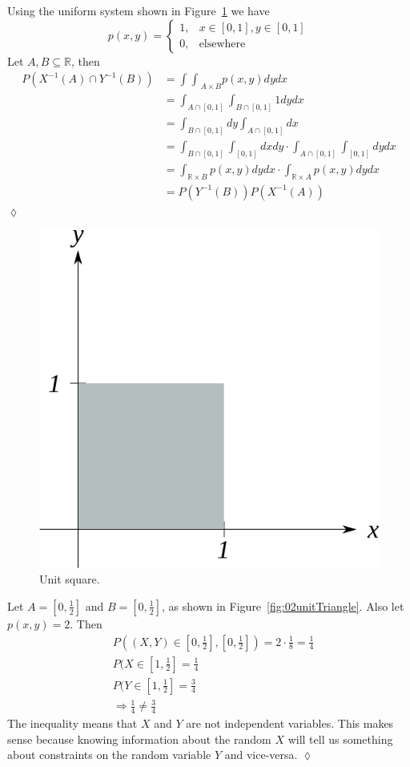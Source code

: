 \begin{example}
Using the uniform system shown in Figure~\ref{fig:02unitSquare} we have
$$p(x,y) = \begin{cases} 1, & x\in[0,1],y\in[0,1] \\ 0, & \text{elsewhere} \end{cases}$$
Let $A,B\subseteq\mathbb{R}$, then
\begin{align*}
P(X^{-1}(A) \cap Y^{-1}(B)) &= {\int\int}_{A\times B} p(x,y)dydx \\
&= \int_{A\cap[0,1]}\int_{B\cap[0,1]} 1 dydx \\
&= \int_{B\cap[0,1]}dy \int_{A\cap[0,1]}dx \\
&= \int_{B\cap[0,1]}\int_{[0,1]}dxdy \cdot \int_{A\cap[0,1]}\int_{[0,1]}dydx \\
&= \int_{\mathbb{R}\times B}p(x,y)dydx \cdot \int_{\mathbb{R}\times A}p(x,y)dydx \\
&= P(Y^{-1}(B)) P(X^{-1}(A))
\end{align*}
$\lozenge$
\end{example}

\begin{figure}[ht!]
\centering
\includegraphics[width=.3\textwidth]{images/02unitSquare}
\caption{Unit square.}
\label{fig:02unitSquare}
\end{figure}

\begin{example}
Let $A=[0,\frac{1}{2}]$ and $B=[0,\frac{1}{2}]$, as shown in Figure~\ref{fig:02unitTriangle}.
Also let $p(x,y)=2$.
Then
\begin{align*}
&P((X,Y)\in [0,\frac{1}{2}],[0,\frac{1}{2}]) = 2\cdot \frac{1}{8} = \frac{1}{4} \\
&P(X\in[1,\frac{1}{2}] = \frac{1}{4} \\
&P(Y\in[1,\frac{1}{2}] = \frac{3}{4} \\
&\Rightarrow \frac{1}{4} \neq \frac{3}{4}
\end{align*}
The inequality means that $X$ and $Y$ are not independent variables.
This makes sense because knowing information about the random $X$ will tell us something about constraints on the random variable $Y$ and vice-versa.
$\lozenge$
\end{example}

